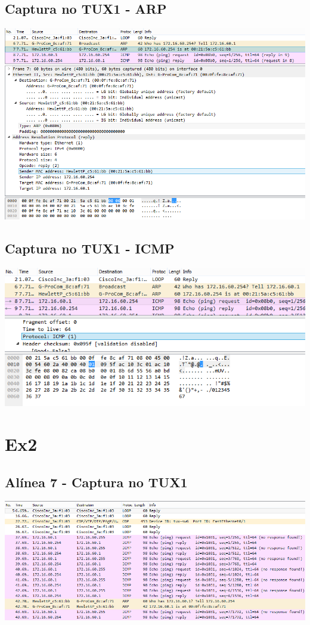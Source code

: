 \documentclass[11pt,a4paper,reqno]{report}
\numberwithin{equation}{section}
\begin{document}
\begin{appendices}
\subsection{Captura no TUX1 - ARP}
\includegraphics[width=18cm]{ex1_arp.png}
\subsection{Captura no TUX1 - ICMP}
\includegraphics[width=18cm]{ex1_icmp.png}

\section{Ex2}%
\subsection{Alínea 7 - Captura no TUX1}
\includegraphics[width=18cm]{ex2_a7_tux1.png}

\end{appendices}
\end{document}
